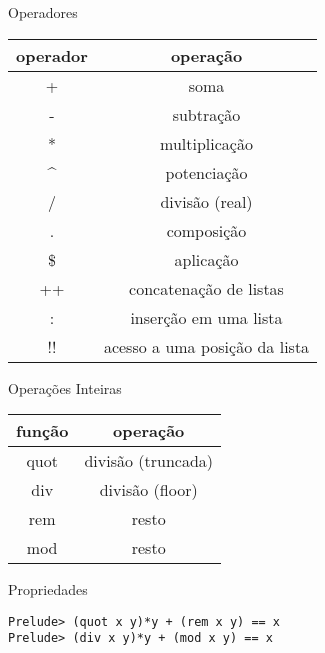 \documentclass{beamer}
\begin{document}
	\begin{frame}{Operadores}
	 \begin{table}[h]
	  \centering
	  \begin{tabular}{c | c}
			\hline
			operador & operação\\
			\hline
			+ & soma \\
			- & subtração \\
			* & multiplicação\\
			\textasciicircum & potenciação\\
			/ & divisão (real)\\
			. & composição \\
			\$ & aplicação \\
			++ & concatenação de listas\\
			: & inserção em uma lista\\
			!! & acesso a uma posição da lista\\			
			\hline
	  \end{tabular}
	 \end{table}	 
	\end{frame}
	
	\begin{frame}[fragile]{Operações Inteiras}
	
	\begin{table}[h]
		\begin{tabular}{c | c}
			\hline
			função & operação\\
			\hline
			quot & divisão (truncada) \\
			div & divisão (floor) \\
			rem & resto \\
			mod & resto \\
			\hline
		\end{tabular}
	\end{table}
	
	\begin{block}{Propriedades}
		\begin{lstlisting}
Prelude> (quot x y)*y + (rem x y) == x  
Prelude> (div x y)*y + (mod x y) == x
		\end{lstlisting}
	 \end{block}

	\end{frame}
	
\end{document}

